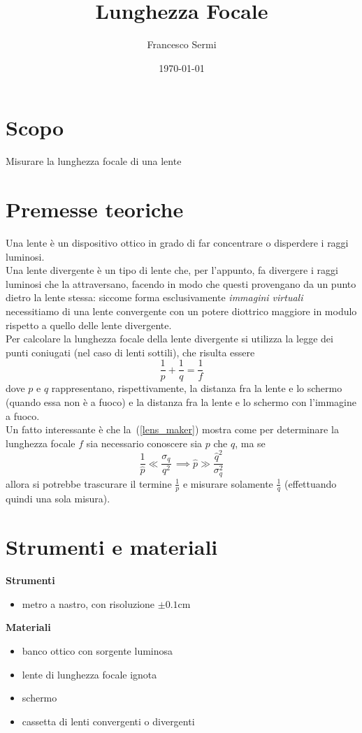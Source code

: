 \documentclass{article}
\title{Lunghezza Focale}
\author{Francesco Sermi}
\date{\today}
\begin{document}
	\maketitle
	\section{Scopo}
	Misurare la lunghezza focale di una lente
	\section{Premesse teoriche}
	Una lente è un dispositivo ottico in grado di far concentrare o disperdere i raggi luminosi. \\
	\noindent Una lente divergente è un tipo di lente che, per l'appunto, fa divergere i raggi luminosi che la attraversano, facendo in modo che questi provengano da un punto dietro la lente stessa: siccome forma esclusivamente \emph{immagini virtuali} necessitiamo di una lente convergente con un potere diottrico maggiore in modulo rispetto a quello delle lente divergente. \\
	Per calcolare la lunghezza focale della lente divergente si utilizza la legge dei punti coniugati (nel caso di lenti sottili), che risulta essere
	\begin{equation}
		\frac{1}{p} + \frac{1}{q} = \frac{1}{f}
		\label{lens_maker}	
	\end{equation}
	dove $p$ e $q$ rappresentano, rispettivamente, la distanza fra la lente e lo schermo (quando essa non è a fuoco) e la distanza fra la lente e lo schermo con l'immagine a fuoco. \\
	Un fatto interessante è che la~(\ref{lens_maker}) mostra come per determinare la lunghezza focale $f$ sia necessario conoscere sia $p$ che $q$, ma se
	\begin{equation}
		\frac{1}{\hat{p}} \ll \frac{\sigma_q}{q^2} \, \implies \hat{p} \gg \frac{\hat{q}^2}{\sigma_q^2}
	\end{equation}
	allora si potrebbe trascurare il termine $\frac{1}{p}$ e misurare solamente $\frac{1}{q}$ (effettuando quindi una sola misura).
	\section{Strumenti e materiali}
	\textbf{Strumenti}	
	\begin{itemize}
		\item metro a nastro, con risoluzione $\pm 0.1 \si{\centi\meter}$
	\end{itemize}
	\textbf{Materiali}
	\begin{itemize}
		\item banco ottico con sorgente luminosa
		\item lente di lunghezza focale ignota
		\item schermo
		\item cassetta di lenti convergenti o divergenti
	\end{itemize}
\end{document}
